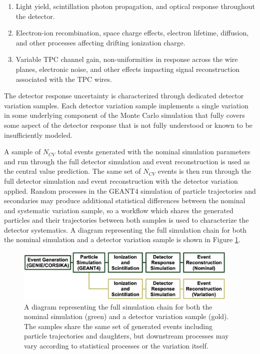 \begin{enumerate}
    \item Light yield, scintillation photon propagation, and optical response throughout the detector.
    \item Electron-ion recombination, space charge effects, electron lifetime, diffusion, and other processes affecting drifting ionization charge.
    \item Variable TPC channel gain, non-uniformities in response across the wire planes, electronic noise, and other effects impacting signal reconstruction associated with the TPC wires.
\end{enumerate}

The detector response uncertainty is characterized through dedicated detector variation samples. Each detector variation sample implements a single variation in some underlying component of the Monte Carlo simulation that fully covers some aspect of the detector response that is not fully understood or known to be insufficiently modeled. 

A sample of $N_{CV}$ total events generated with the nominal simulation parameters and run through the full detector simulation and event reconstruction is used as the central value prediction. The same set of $N_{CV}$ events is then run through the full detector simulation and event reconstruction with the detector variation applied. Random processes in the GEANT4 simulation of particle trajectories and secondaries may produce additional statistical differences between the nominal and systematic variation sample, so a workflow which shares the generated particles and their trajectories between both samples is used to characterize the detector systematics. A diagram representing the full simulation chain for both the nominal simulation and a detector variation sample is shown in Figure \ref{fig:systematic_variation_sample_flow}.

\begin{figure}
    \centering
    \includegraphics[width=0.95\textwidth]{figures/systematics/systematic_variation_sample_flow.png}
    \caption{A diagram representing the full simulation chain for both the nominal simulation (green) and a detector variation sample (gold). The samples share the same set of generated events including particle trajectories and daughters, but downstream processes may vary according to statistical processes or the variation itself.}
    \label{fig:systematic_variation_sample_flow}
\end{figure}


